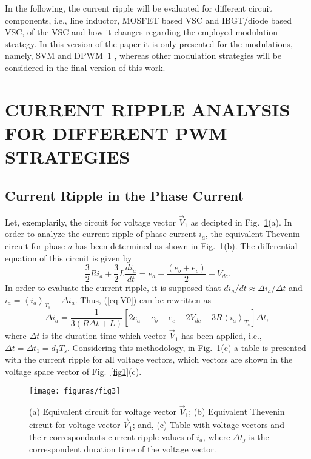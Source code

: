 \documentclass[10pt, onecolumn,conference]{IEEEtran}
\begin{document}
In the following, the current ripple will be evaluated for different circuit components, i.e., line inductor, MOSFET based VSC and IBGT/diode based VSC,  of the VSC and how it changes regarding the employed modulation strategy. In this version of the paper it is only presented for the modulations, namely, SVM and DPWM~1 \cite{Livros-Lipo}, whereas other modulation strategies will be considered in the final version of this work.

\section{\MakeUppercase{Current Ripple Analysis for Different PWM Strategies}}%

\subsection{Current Ripple in the Phase Current}
	
Let, exemplarily, the circuit for voltage vector $\vec{V}_1$ as decipted in Fig.~\ref{fig3}(a). In order to analyze the current ripple of phase current $i_a$, the equivalent Thevenin circuit for phase $a$ has been determined as shown in Fig.~\ref{fig3}(b). The differential equation of this circuit is given by
%
\begin{equation}
\label{eq:V0}
\dfrac{3}{2}Ri_a+\dfrac{3}{2}L\dfrac{di_a}{dt}=e_a-\dfrac{(e_b+e_c)}{2}-V_{dc}.
\end{equation} In order to evaluate the current ripple, it is supposed that ${di_a}/{dt}\!\approx\! {\Delta i_a}/{\Delta t}$ and $i_a\!=\!\left\langle i_a\right \rangle_{T_s}\!+\!\Delta i_a$. Thus, (\ref{eq:V0}) can be rewritten as
%
\begin{equation}
\Delta i_a = \dfrac{1}{3(R\Delta t +L) }\left[ 2e_a - e_b-e_c-2V_{dc}-3R\left\langle i_a\right \rangle_{T_s}\right] \Delta t,
\end{equation} where $\Delta t$ is the duration time which vector $\vec{V}_1$ has been applied, i.e., $\Delta t\!=\!\Delta t_1\!=\!d_1T_s$. Considering this methodology, in Fig.~\ref{fig3}(c) a table  is presented with the current ripple for all voltage vectors, which vectors are shown in the voltage space vector of Fig.~\ref{fig1}(c).
\!\!\!
% 
\begin{figure}[bp!]
	\centering
	\texttt{[image: figuras/fig3]}
	\caption{(a) Equivalent circuit for voltage vector $\vec{V}_1$; (b) Equivalent Thevenin circuit for voltage vector $\vec{V}_1$; and, (c) Table with voltage vectors and their correspondants current ripple values of $i_a$, {where $\Delta t_j$ is the correspondent duration time of the voltage vector.}}
	\label{fig3}
\end{figure}
\end{document}
